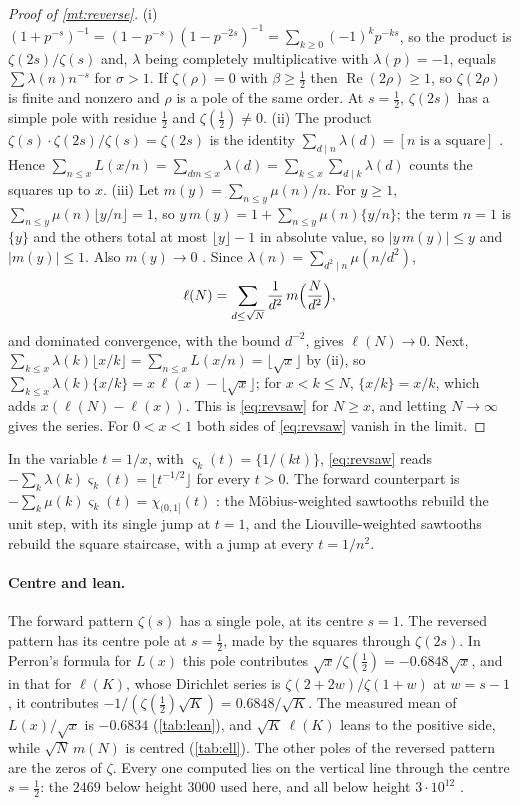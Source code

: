 \documentclass[11pt]{article}
\theoremstyle{definition}\newtheorem{definition}[theorem]{Definition}
\theoremstyle{remark}\newtheorem{remark}[theorem]{Remark}
\theoremstyle{definition}\newtheorem{axiom}{Axiom}
\renewcommand{\Re}{\operatorname{Re}}\renewcommand{\Im}{\operatorname{Im}}
\newcommand{\fr}[1]{\{#1\}}
\begin{document}
\begin{proof}[Proof of \cref{mt:reverse}]
(i) $(1+p^{-s})^{-1}=(1-p^{-s})(1-p^{-2s})^{-1}=\sum_{k\ge0}(-1)^kp^{-ks}$, so the product is $\zeta(2s)/\zeta(s)$ and, $\lambda$ being completely multiplicative with $\lambda(p)=-1$, equals $\sum\lambda(n)n^{-s}$ for $\sigma>1$. If $\zeta(\rho)=0$ with $\beta\ge\frac12$ then $\Re(2\rho)\ge1$, so $\zeta(2\rho)$ is finite and nonzero \cite[\S3.3]{Titchmarsh} and $\rho$ is a pole of the same order. At $s=\frac12$, $\zeta(2s)$ has a simple pole with residue $\frac12$ and $\zeta(\frac12)\ne0$.
(ii) The product $\zeta(s)\cdot\zeta(2s)/\zeta(s)=\zeta(2s)$ is the identity $\sum_{d\mid n}\lambda(d)=[n\text{ is a square}]$ \cite[Theorem 2.19]{Apostol}. Hence $\sum_{n\le x}L(x/n)=\sum_{dm\le x}\lambda(d)=\sum_{k\le x}\sum_{d\mid k}\lambda(d)$ counts the squares up to $x$.
(iii) Let $m(y)=\sum_{n\le y}\mu(n)/n$. For $y\ge1$, $\sum_{n\le y}\mu(n)\lfloor y/n\rfloor=1$, so $y\,m(y)=1+\sum_{n\le y}\mu(n)\fr{y/n}$; the term $n=1$ is $\fr y$ and the others total at most $\lfloor y\rfloor-1$ in absolute value, so $|y\,m(y)|\le y$ and $|m(y)|\le1$. Also $m(y)\to0$ \cite[Ch.~4]{Apostol}. Since $\lambda(n)=\sum_{d^2\mid n}\mu(n/d^2)$,
\[
\ell(N)=\sum_{d\le\sqrt N}\frac1{d^2}\,m\Bigl(\frac N{d^2}\Bigr),
\]
and dominated convergence, with the bound $d^{-2}$, gives $\ell(N)\to0$. Next, $\sum_{k\le x}\lambda(k)\lfloor x/k\rfloor=\sum_{n\le x}L(x/n)=\lfloor\sqrt x\rfloor$ by (ii), so $\sum_{k\le x}\lambda(k)\fr{x/k}=x\,\ell(x)-\lfloor\sqrt x\rfloor$; for $x<k\le N$, $\fr{x/k}=x/k$, which adds $x(\ell(N)-\ell(x))$. This is \eqref{eq:revsaw} for $N\ge x$, and letting $N\to\infty$ gives the series. For $0<x<1$ both sides of \eqref{eq:revsaw} vanish in the limit.
\end{proof}

In the variable $t=1/x$, with $\varsigma_k(t)=\fr{1/(kt)}$, \eqref{eq:revsaw} reads $-\sum_k\lambda(k)\varsigma_k(t)=\lfloor t^{-1/2}\rfloor$ for every $t>0$. The forward counterpart is $-\sum_k\mu(k)\varsigma_k(t)=\chi_{(0,1]}(t)$ \cite{S10}: the Möbius-weighted sawtooths rebuild the unit step, with its single jump at $t=1$, and the Liouville-weighted sawtooths rebuild the square staircase, with a jump at every $t=1/n^2$.

\paragraph{Centre and lean.} The forward pattern $\zeta(s)$ has a single pole, at its centre $s=1$. The reversed pattern has its centre pole at $s=\frac12$, made by the squares through $\zeta(2s)$. In Perron's formula for $L(x)$ this pole contributes $\sqrt x/\zeta(\frac12)=-0.6848\sqrt x$, and in that for $\ell(K)$, whose Dirichlet series is $\zeta(2+2w)/\zeta(1+w)$ at $w=s-1$, it contributes $-1/(\zeta(\frac12)\sqrt K)=0.6848/\sqrt K$. The measured mean of $L(x)/\sqrt x$ is $-0.6834$ (\cref{tab:lean}), and $\sqrt K\,\ell(K)$ leans to the positive side, while $\sqrt N\,m(N)$ is centred (\cref{tab:ell}). The other poles of the reversed pattern are the zeros of $\zeta$. Every one computed lies on the vertical line through the centre $s=\frac12$: the $2469$ below height $3000$ used here, and all below height $3\cdot10^{12}$ \cite{PT}.
\end{document}
